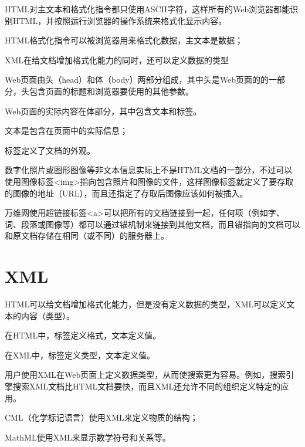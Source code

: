 HTML对主文本和格式化指令都只使用ASCII字符，这样所有的Web浏览器都能识别HTML，并按照运行浏览器的操作系统来格式化显示内容。


\begin{compactitem}
\item HTML格式化指令可以被浏览器用来格式化数据，主文本是数据；
\item XML在给文档增加格式化能力的同时，还可以定义数据的类型
\end{compactitem}

Web页面由头（head）和体（body）两部分组成，其中头是Web页面的的一部分，头包含页面的标题和浏览器要使用的其他参数。

Web页面的实际内容在体部分，其中包含文本和标签。

\begin{compactitem}
\item 文本是包含在页面中的实际信息；
\item 标签定义了文档的外观。
\end{compactitem}


数字化照片或图形图像等非文本信息实际上不是HTML文档的一部分，不过可以使用图像标签<img>指向包含照片和图像的文件，这样图像标签就定义了要存取的图像的地址（URL），而且还指定了存取后图像应该如何被插入。

万维网使用超链接标签<a>可以把所有的文档链接到一起，任何项（例如字、词、段落或图像等）都可以通过锚机制来链接到其他文档，而且锚指向的文档可以和原文档存储在相同（或不同）的服务器上。



\section{XML}


HTML可以给文档增加格式化能力，但是没有定义数据的类型，XML可以定义文本的内容（类型）。

\begin{compactitem}
\item 在HTML中，标签定义格式，文本定义值。
\item 在XML中，标签定义类型，文本定义值。
\end{compactitem}

用户使用XML在Web页面上定义数据类型，从而使搜索更为容易。例如，搜索引擎搜索XML文档比HTML文档要快，而且XML还允许不同的组织定义特定的应用。

\begin{compactitem}
\item CML（化学标记语言）使用XML来定义物质的结构；
\item MathML使用XML来显示数学符号和关系等。
\end{compactitem}









































